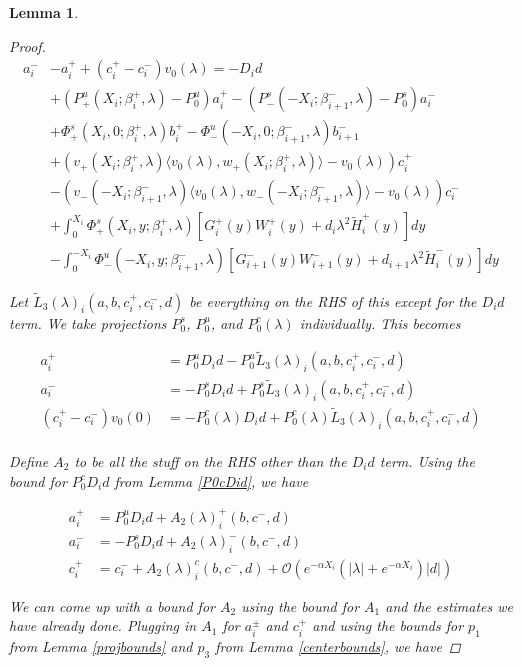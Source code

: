 \documentclass[12pt]{article}
\newtheorem{lemma}{Lemma}
\begin{document}
\begin{lemma}
\begin{proof}
\begin{align*}
a_i^- &- a_i^+ + (c_i^+ - c_i^-)v_0(\lambda) = -D_i d  \\
&+ (P^u_+(X_i; \beta_i^+, \lambda) - P_0^u)a_i^+ - (P^s_-(-X_i; \beta_{i+1}^-,\lambda) - P_0^s)a_i^- \\
&+ \Phi^s_+(X_i, 0; \beta_i^+, \lambda)b_i^+ - \Phi^u_-(-X_i, 0; \beta_{i+1}^-, \lambda) b_{i+1}^- \\
&+ (v_+(X_i; \beta_i^+, \lambda) \langle v_0(\lambda), w_+(X_i; \beta_i^+, \lambda) \rangle - v_0(\lambda) ) c_i^+ \\
&- (v_-(-X_i; \beta_{i+1}^-, \lambda) \langle v_0(\lambda), w_-(-X_i; \beta_{i+1}^-, \lambda) \rangle - v_0(\lambda) ) c_i^- \\
&+ \int_0^{X_i} \Phi^s_+(X_i, y; \beta_i^+, \lambda) [ G_i^+(y) W_i^+(y) + d_i \lambda^2 \tilde{H}_i^+(y) ] dy \\
&- \int_0^{-X_i} \Phi^u_-(-X_i, y; \beta_{i+1}^-, \lambda) [ G_{i+1}^-(y) W_{i+1}^-(y) + d_{i+1} \lambda^2 \tilde{H}_i^-(y) ] dy
\end{align*}

Let $\tilde{L}_3(\lambda)_i(a, b, c_i^+, c_i^-, d)$ be everything on the RHS of this except for the $D_i d$ term.  We take projections $P^s_0$, $P^u_0$, and $P^c_0(\lambda)$ individually. This becomes

\begin{align*}
a_i^+ &= P^u_0 D_i d - P^u_0 \tilde{L}_3(\lambda)_i(a, b, c_i^+, c_i^-, d) \\
a_i^- &= -P^s_0 D_i d + P^s_0 \tilde{L}_3(\lambda)_i(a, b, c_i^+, c_i^-, d) \\
(c_i^+ - c_i^-)v_0(0) &= -P^c_0(\lambda) D_i d + P^c_0(\lambda) \tilde{L}_3(\lambda)_i(a, b, c_i^+, c_i^-, d) \\
\end{align*}

Define $A_2$ to be all the stuff on the RHS other than the $D_i d$ term. Using the bound for $P^c_0 D_i d$ from Lemma \ref{P0cDid}, we have

\begin{align*}
a_i^+ &= P^u_0 D_i d + A_2(\lambda)_i^+(b, c^-, d) \\
a_i^- &= -P^s_0 D_i d + A_2(\lambda)_i^-(b, c^-, d) \\
c_i^+ &= c_i^- + A_2(\lambda)_i^c(b, c^-, d) + \mathcal{O}( e^{-\alpha X_i} \left( |\lambda| +  e^{-\alpha X_i}  \right) |d| )
\end{align*}

We can come up with a bound for $A_2$ using the bound for $A_1$ and the estimates we have already done. Plugging in $A_1$ for $a_i^\pm$ and $c_i^+$ and using the bounds for $p_1$ from Lemma \ref{projbounds} and $p_3$ from Lemma \ref{centerbounds}, we have


\end{proof}
\end{lemma}
\end{document}
